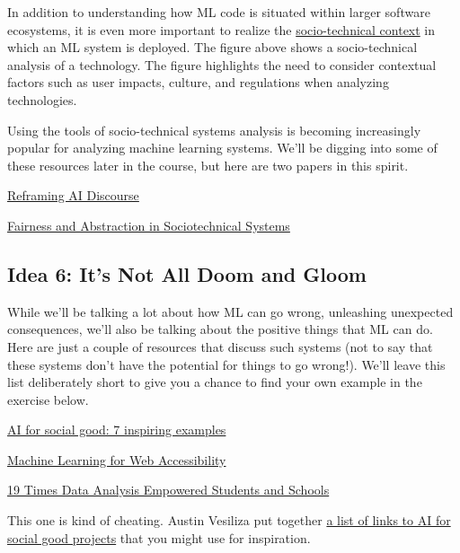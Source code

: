 \documentclass[assignment01_Solutions]{subfiles}
\begin{document}
In addition to understanding how ML code is situated within larger software ecosystems, it is even more important to realize the \href{https://en.wikipedia.org/wiki/Sociotechnical_system}{socio-technical context} in which an ML system is deployed.  The figure above shows a socio-technical analysis of a technology.  The figure highlights the need to consider contextual factors such as user impacts, culture, and regulations when analyzing technologies.

Using the tools of socio-technical systems analysis is becoming increasingly popular for analyzing machine learning systems.  We'll be digging into some of these resources later in the course, but here are two papers in this spirit.
\bi
\item \href{https://link.springer.com/article/10.1007/s11023-017-9417-6}{Reframing AI Discourse}
\item \href{https://dl.acm.org/citation.cfm?id=3287598}{Fairness and Abstraction in Sociotechnical Systems}
\ei

\subsection*{Idea 6: It's Not All Doom and Gloom}
While we'll be talking a lot about how ML can go wrong, unleashing unexpected consequences, we'll also be talking about the positive things that ML can do.  Here are just a couple of resources that discuss such systems (not to say that these systems don't have the potential for things to go wrong!).  We'll leave this list deliberately short to give you a chance to find your own example in the exercise below.

\bi
\item \href{https://www.springboard.com/blog/ai-for-good/}{AI for social good: 7 inspiring examples}
\item \href{https://medium.com/myplanet-musings/making-the-web-more-accessible-using-machine-learning-8a32eaafdb3a}{Machine Learning for Web Accessibility}
\item \href{https://fpf.org/wp-content/uploads/2016/03/Final_19Times-Data_Mar2016-1.pdf}{19 Times Data Analysis Empowered Students and Schools}
\item This one is kind of cheating.  Austin Vesiliza put together \href{https://www.notion.so/ML-for-Good-c0cc352c88b04e719c187c8e4a6f5887}{a list of links to AI for social good projects} that you might use for inspiration.
\ei


\end{document}

